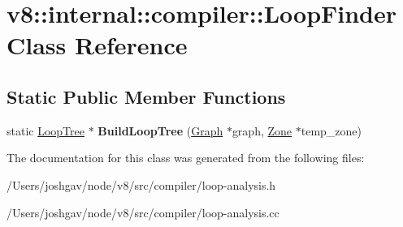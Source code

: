 \hypertarget{classv8_1_1internal_1_1compiler_1_1_loop_finder}{}\section{v8\+:\+:internal\+:\+:compiler\+:\+:Loop\+Finder Class Reference}
\label{classv8_1_1internal_1_1compiler_1_1_loop_finder}
\subsection*{Static Public Member Functions}
\begin{DoxyCompactItemize}
\item 
static \hyperlink{classv8_1_1internal_1_1compiler_1_1_loop_tree}{Loop\+Tree} $\ast$ {\bfseries Build\+Loop\+Tree} (\hyperlink{classv8_1_1internal_1_1compiler_1_1_graph}{Graph} $\ast$graph, \hyperlink{classv8_1_1internal_1_1_zone}{Zone} $\ast$temp\+\_\+zone)\hypertarget{classv8_1_1internal_1_1compiler_1_1_loop_finder_a632e27549ef62293a4a5f7817cf15738}{}\label{classv8_1_1internal_1_1compiler_1_1_loop_finder_a632e27549ef62293a4a5f7817cf15738}

\end{DoxyCompactItemize}


The documentation for this class was generated from the following files\+:\begin{DoxyCompactItemize}
\item 
/\+Users/joshgav/node/v8/src/compiler/loop-\/analysis.\+h\item 
/\+Users/joshgav/node/v8/src/compiler/loop-\/analysis.\+cc\end{DoxyCompactItemize}
